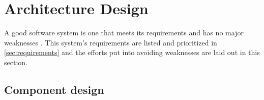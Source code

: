 \section{Architecture Design}
A good software system is one that meets its requirements and has no major weaknesses \citep[p.~179]{Rod-Aalborg}.
This system's requirements are listed and prioritized in \ref{sec:requirements} and the efforts put into avoiding weaknesses are laid out in this section.




\subsection{Component design}





